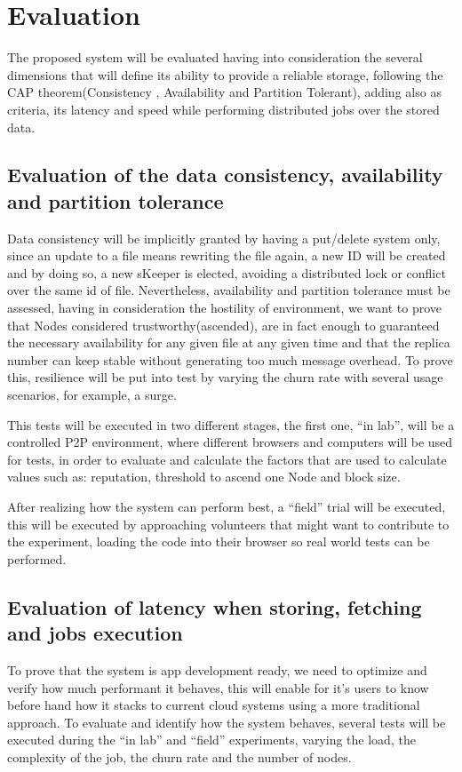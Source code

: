 
% 
% 

\section{Evaluation}

The proposed system will be evaluated having into consideration the several dimensions that will define its ability to provide a reliable storage, following the CAP theorem(Consistency , Availability and Partition Tolerant), adding also as criteria, its latency and speed while performing distributed jobs over the stored data.

\subsection{Evaluation of the data consistency, availability and partition tolerance}

Data consistency will be implicitly granted by having a put/delete system only, since an update to a file means rewriting the file again, a new ID will be created and by doing so, a new sKeeper is elected, avoiding a distributed lock or conflict over the same id of file. Nevertheless, availability and partition tolerance must be assessed, having in consideration the hostility of environment, we want to prove that Nodes considered trustworthy(ascended), are in fact enough to guaranteed the necessary availability for any given file at any given time and that the replica number can keep stable without generating too much message overhead. To prove this, resilience will be put into test by varying the churn rate with several usage scenarios, for example, a surge.

This tests will be executed in two different stages, the first one, ``in lab'', will be a controlled P2P environment, where different browsers and computers will be used for tests, in order to evaluate and calculate the factors that are used to calculate values such as: reputation, threshold to ascend one Node and block size. 

After realizing how the system can perform best, a ``field'' trial will be executed, this will be executed by approaching volunteers that might want to contribute to the experiment, loading the code into their browser so real world tests can be performed.

\subsection{Evaluation of latency when storing, fetching and jobs execution}

To prove that the system is app development ready, we need to optimize and verify how much performant it behaves, this will enable for it's users to know before hand how it stacks to current cloud systems using a more traditional approach. To evaluate and identify how the system behaves, several tests will be executed during the ``in lab'' and ``field'' experiments, varying the load, the complexity of the job, the churn rate and the number of nodes.